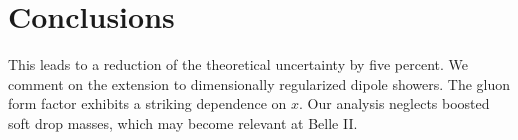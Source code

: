 \section{Conclusions}\label{sec:conclusions}

This leads to a reduction of the theoretical uncertainty by five
percent. We comment on the extension to dimensionally regularized dipole
showers. The gluon form factor exhibits a striking dependence on $x$.
Our analysis neglects boosted soft drop masses, which may become
relevant at Belle II.

